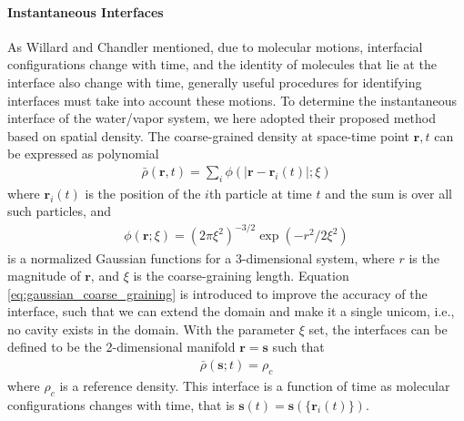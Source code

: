 \FloatBarrier
\paragraph{Instantaneous Interfaces}
As Willard and Chandler mentioned, due to molecular motions, interfacial configurations
change with time, and the identity of molecules that lie at the interface also change with time, generally useful procedures for
identifying interfaces must take into account these motions. \cite{Willard2010} 
To determine the instantaneous interface of the water/vapor system, we here adopted their proposed method based on spatial density.
The coarse-grained density at space-time point $\mathbf{r},t$ can be expressed as polynomial
\begin{eqnarray}
\bar{\rho}(\mathbf{r}, t)=\sum_{i} \phi(|\mathbf{r}-\mathbf{r}_{i}(t)|; \xi) 
\end{eqnarray}
where ${\mathbf{r}}_i(t)$ is the position of the $i$th particle at time $t$ and the sum is over all such particles, and 
\begin{eqnarray}
\phi(\mathbf{r};\xi)=(2 \pi \xi^{2})^{-3/ 2} \exp (-r^{2} / 2 \xi^{2}) 
\label{eq:gaussian_coarse_graining}
\end{eqnarray} 
is a normalized Gaussian functions for a 3-dimensional system, where $r$ is the magnitude of ${\mathbf r}$, and $\xi$ is the coarse-graining length.
Equation \ref{eq:gaussian_coarse_graining} is introduced to improve the accuracy of the interface, such that we can extend the domain and make it a single unicom,
i.e., no cavity exists in the domain.
With the parameter $\xi$ set, the interfaces can be defined to be the 2-dimensional manifold ${\mathbf r} = {\mathbf s}$ such that
\begin{eqnarray}
\bar\rho(\mathbf{s};t)= \rho_c 
\label{eq:rho_c}
\end{eqnarray} 
where $\rho_c$ is a reference density. This interface is a function of time as molecular configurations changes with time, that is 
${\mathbf s}(t) = {\mathbf s}(\{{\mathbf r}_i(t)\})$. 

